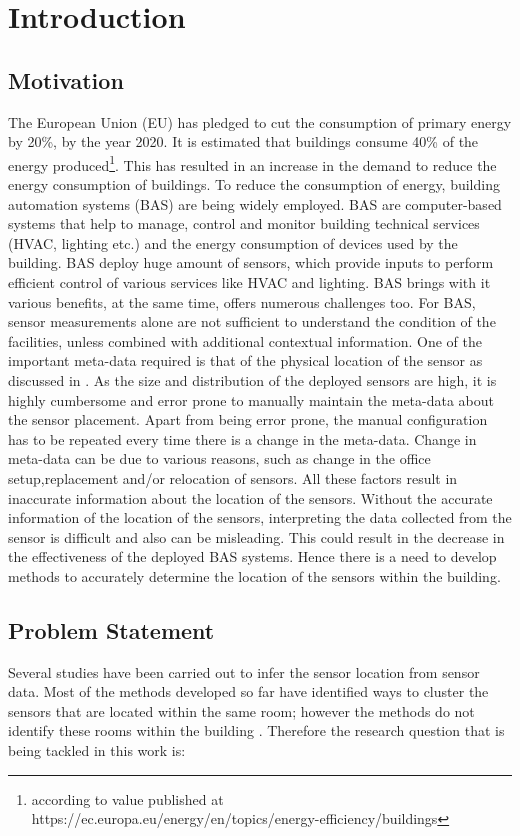 \chapter{Introduction}
\label{chp:introduction}
\section{Motivation}
The European Union (EU) has pledged to cut the consumption of primary energy by 20\%, by the year 2020.  It is estimated that buildings consume 40\% of the energy produced\footnote{according to value published at https://ec.europa.eu/energy/en/topics/energy-efficiency/buildings }.  This has resulted in an increase in the demand to reduce the energy consumption of buildings. To reduce the consumption of energy, building automation systems (BAS) are being widely employed. BAS are computer-based systems that help to manage, control and monitor building technical services (HVAC, lighting etc.) and the energy consumption of devices used by the building.  BAS deploy huge amount of sensors, which provide inputs to perform efficient control of various services like HVAC and lighting. BAS brings with it various benefits, at the same time, offers numerous challenges too. For BAS, sensor measurements alone are not sufficient to understand the condition of the facilities, unless combined with additional contextual information. One of the important meta-data required is that of the physical location of the sensor as discussed in  \cite{liu2009requirements}.
As the size and distribution of the deployed sensors are high, it is highly cumbersome and error prone to manually maintain the meta-data about the sensor placement. Apart from being error prone, the manual configuration has to be repeated every time there is a change in the meta-data. Change in meta-data can be due to various reasons, such as change in the office setup,replacement and/or relocation of sensors. All these factors result in inaccurate information about the location of the sensors. Without the accurate information of the location of the sensors, interpreting the data collected from the sensor is difficult and also can be misleading. This could result in the decrease in the effectiveness of the deployed BAS systems. Hence there is a need to develop methods to accurately determine the location of the sensors within the building.

\section{Problem Statement}
Several studies have been carried out to infer the sensor location from sensor data. Most of the methods developed so far have identified ways to cluster the sensors that are located within the same room; however the methods do not identify these rooms within the building \cite{doi:10.1061/9780784413616.226}.  Therefore the research question that is being tackled in this work is:

